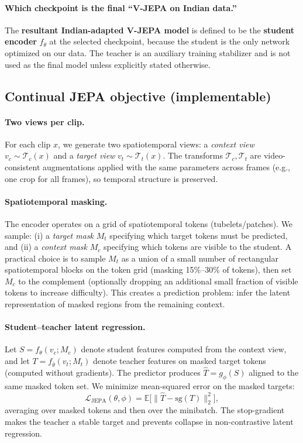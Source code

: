 \paragraph{Which checkpoint is the final ``V-JEPA on Indian data.''} The \textbf{resultant Indian-adapted V-JEPA model} is defined to be the \textbf{student encoder} $f_\theta$ at the selected checkpoint, because the student is the only network optimized on our data. The teacher is an auxiliary training stabilizer and is not used as the final model unless explicitly stated otherwise.

\subsection{Continual JEPA objective (implementable)}\label{sec:ctp_objective}
\paragraph{Two views per clip.} For each clip $x$, we generate two spatiotemporal views:
a \emph{context view} $v_c\sim\mathcal{T}_c(x)$ and a \emph{target view} $v_t\sim\mathcal{T}_t(x)$.
The transforms $\mathcal{T}_c,\mathcal{T}_t$ are video-consistent augmentations applied with the same parameters across frames (e.g., one crop for all frames), so temporal structure is preserved.
\paragraph{Spatiotemporal masking.} The encoder operates on a grid of spatiotemporal tokens (tubelets/patches). We sample:
(i) a \emph{target mask} $M_t$ specifying which target tokens must be predicted, and
(ii) a \emph{context mask} $M_c$ specifying which tokens are visible to the student. A practical choice is to sample $M_t$ as a union of a small number of rectangular spatiotemporal blocks on the token grid (masking 15\%--30\% of tokens), then set $M_c$ to the complement (optionally dropping an additional small fraction of visible tokens to increase difficulty). This creates a prediction problem: infer the latent representation of masked regions from the remaining context.
\paragraph{Student--teacher latent regression.} Let $S=f_\theta(v_c;M_c)$ denote student features computed from the context view, and let $T=f_{\bar{\theta}}(v_t;M_t)$ denote teacher features on masked target tokens (computed without gradients). The predictor produces $\hat{T}=g_\phi(S)$ aligned to the same masked token set. We minimize mean-squared error on the masked targets:
\[
\mathcal{L}_{\mathrm{JEPA}}(\theta,\phi)
=
\mathbb{E}\Big[\big\|\hat{T}-\mathrm{sg}(T)\big\|_2^2\Big],
\]
averaging over masked tokens and then over the minibatch. The stop-gradient makes the teacher a stable target and prevents collapse in non-contrastive latent regression.
